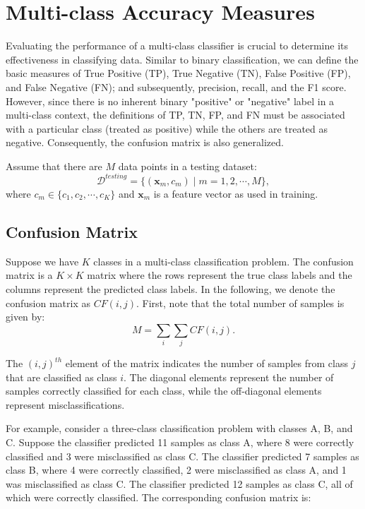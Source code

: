 \documentclass[12pt]{article}
\begin{document}
\section{Multi-class Accuracy Measures}
Evaluating the performance of a multi-class classifier is crucial to determine its effectiveness in classifying data. Similar to binary classification, we can define the basic measures of True Positive (TP), True Negative (TN), False Positive (FP), and False Negative (FN); and subsequently, precision, recall, and the F1 score. However, since there is no inherent binary "positive" or "negative" label in a multi-class context, the definitions of TP, TN, FP, and FN must be associated with a particular class (treated as positive) while the others are treated as negative. Consequently, the confusion matrix is also generalized.

Assume that there are \(M\) data points in a testing dataset:
\[
\mathcal{D}^{testing} = \{ (\bm{x}_m, c_m) \mid m = 1, 2, \cdots, M\},
\]
where \(c_m \in \{c_1, c_2, \cdots, c_K\}\) and \(\bm{x}_m\) is a feature vector as used in training.

\subsection{Confusion Matrix}
Suppose we have \(K\) classes in a multi-class classification problem. The confusion matrix is a \(K \times K\) matrix where the rows represent the true class labels and the columns represent the predicted class labels. In the following, we denote the confusion matrix as \(CF(i, j)\). First, note that the total number of samples is given by:
\[
M = \sum_i \sum_j CF(i, j).
\]

The \((i,j)^{th}\) element of the matrix indicates the number of samples from class \(j\) that are classified as class \(i\). The diagonal elements represent the number of samples correctly classified for each class, while the off-diagonal elements represent misclassifications.

For example, consider a three-class classification problem with classes A, B, and C. Suppose the classifier predicted 11 samples as class A, where 8 were correctly classified and 3 were misclassified as class C. The classifier predicted 7 samples as class B, where 4 were correctly classified, 2 were misclassified as class A, and 1 was misclassified as class C. The classifier predicted 12 samples as class C, all of which were correctly classified. The corresponding confusion matrix is:
\end{document}
